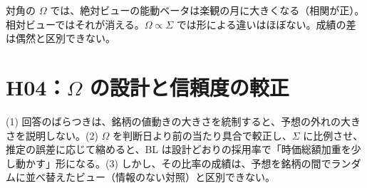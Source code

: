 \documentclass[xelatex,ja=standard,jafont=haranoaji,a4paper,10pt,openany]{bxjsreport}
\begin{document}
\begin{predbox}
対角の $\Omega$ では、絶対ビューの能動ベータは楽観の月に大きくなる（相関が正）。相対ビューではそれが消える。$\Omega\propto\Sigma$ では形による違いはほぼない。成績の差は偶然と区別できない。
\end{predbox}

\chapter{H04：$\Omega$ の設計と信頼度の較正}\label{ch:h04}

\begin{hypbox}
(1) 回答のばらつきは、銘柄の値動きの大きさを統制すると、予想の外れの大きさを説明しない。(2) $\Omega$ を判断日より前の当たり具合で較正し、$\Sigma$ に比例させ、推定の誤差に応じて縮めると、BL は設計どおりの採用率で「時価総額加重を少し動かす」形になる。(3) しかし、その比率の成績は、予想を銘柄の間でランダムに並べ替えたビュー（情報のない対照）と区別できない。
\end{hypbox}
\end{document}
